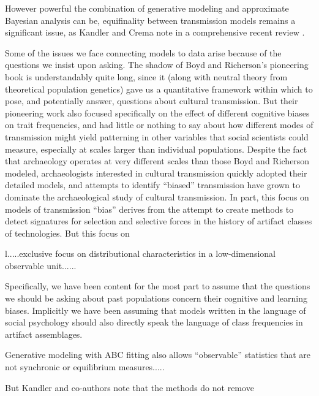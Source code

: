 However powerful the combination of generative modeling and approximate Bayesian analysis can be, equifinality between transmission models remains a significant issue, as Kandler and Crema note in a comprehensive recent review \citet{kandler2019analysing}.  

Some of the issues we face connecting models to data arise because of the questions we insist upon asking.  The shadow of Boyd and Richerson's \citeyearpar{BR1985} pioneering book is understandably quite long, since it (along with neutral theory from theoretical population genetics) gave us a quantitative framework within which to pose, and potentially answer, questions about cultural transmission.  But their pioneering work also focused specifically on the effect of different cognitive biases on trait frequencies, and had little or nothing to say about how different modes of transmission might yield patterning in other variables that social scientists could measure, especially at scales larger than individual populations.  Despite the fact that archaeology operates at very different scales than those Boyd and Richerson modeled, archaeologists interested in cultural transmission quickly adopted their detailed models, and attempts to identify ``biased'' transmission have grown to dominate the archaeological study of cultural transmission.  In part, this focus on models of transmission ``bias'' derives from the attempt to create methods to detect signatures for selection and selective forces in the history of artifact classes of technologies.  But this focus on 

l.....exclusive focus on distributional characteristics in a low-dimensional observable unit......


Specifically, we have been content for the most part to assume that the questions we should be asking about past populations concern their cognitive and learning biases.  Implicitly we have been assuming that models written in the language of social psychology should also directly speak the language of class frequencies in artifact assemblages.






Generative modeling with ABC fitting also allows ``observable'' statistics that are not synchronic or equilibrium measures.....

But Kandler and co-authors note that the methods do not remove 



